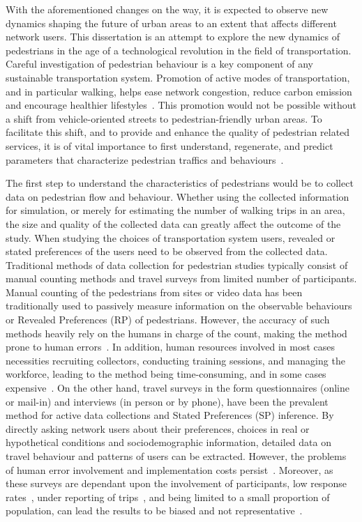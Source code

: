 With the aforementioned changes on the way, it is expected to observe new dynamics shaping the future of urban areas to an extent that affects different network users. This dissertation is an attempt to explore the new dynamics of pedestrians in the age of a technological revolution in the field of transportation. Careful investigation of pedestrian behaviour is a key component of any sustainable transportation system. Promotion of active modes of transportation, and in particular walking, helps ease network congestion, reduce carbon emission and encourage healthier lifestyles~\cite{wen2005promoting}. This promotion would not be possible without a shift from vehicle-oriented streets to pedestrian-friendly urban areas. To facilitate this shift, and to provide and enhance the quality of pedestrian related services, it is of vital importance to first understand, regenerate, and predict parameters that characterize pedestrian traffics and behaviours~\cite{nikolic2016probabilistic}. 

The first step to understand the characteristics of pedestrians would be to collect data on pedestrian flow and behaviour. Whether using the collected information for simulation, or merely for estimating the number of walking trips in an area, the size and quality of the collected data can greatly affect the outcome of the study. When studying the choices of transportation system users, revealed or stated preferences of the users need to be observed from the collected data. Traditional methods of data collection for pedestrian studies typically consist of manual counting methods and travel surveys from limited number of participants. Manual counting of the pedestrians from sites or video data has been traditionally used to passively measure information on the observable behaviours or Revealed Preferences (RP) of pedestrians. However, the accuracy of such methods heavily rely on the humans in charge of the count, making the method prone to human errors~\cite{ryus2014guidebook}. In addition, human resources involved in most cases necessities recruiting collectors, conducting training sessions, and managing the workforce, leading to the method being time-consuming, and in some cases expensive~\cite{lee2017emerging}. On the other hand, travel surveys in the form questionnaires (online or mail-in) and interviews (in person or by phone), have been the prevalent method for active data collections and Stated Preferences (SP) inference. By directly asking network users about their preferences, choices in real or hypothetical conditions and sociodemographic information, detailed data on travel behaviour and patterns of users can be extracted. However, the problems of human error involvement and implementation costs persist~\cite{huang2019transport}. Moreover, as these surveys are dependant upon the involvement of participants, low response rates~\cite{ogle2005georgia}, under reporting of trips~\cite{bricka2006comparative}, and being limited to a small proportion of population, can lead the results to be biased and not representative~\cite{shen2014review,dollar2012pedestrian}. 

